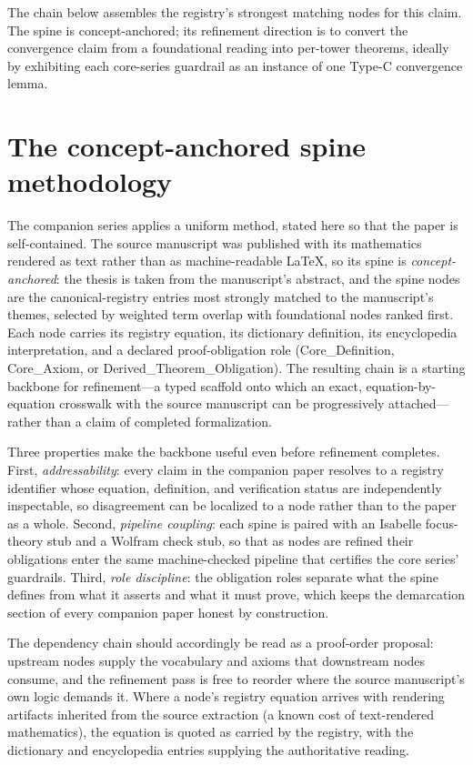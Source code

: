 \documentclass[11pt]{article}
\theoremstyle{remark}
\begin{document}
The chain below assembles the registry's strongest matching nodes for this claim. The spine is concept-anchored; its refinement direction is to convert the convergence claim from a foundational reading into per-tower theorems, ideally by exhibiting each core-series guardrail as an instance of one Type-C convergence lemma.

\section{The concept-anchored spine methodology}
\label{sec:method}

The companion series applies a uniform method, stated here so that the paper is self-contained. The source manuscript was published with its mathematics rendered as text rather than as machine-readable LaTeX, so its spine is \emph{concept-anchored}: the thesis is taken from the manuscript's abstract, and the spine nodes are the canonical-registry entries most strongly matched to the manuscript's themes, selected by weighted term overlap with foundational nodes ranked first. Each node carries its registry equation, its dictionary definition, its encyclopedia interpretation, and a declared proof-obligation role (Core\_Definition, Core\_Axiom, or Derived\_Theorem\_Obligation). The resulting chain is a starting backbone for refinement---a typed scaffold onto which an exact, equation-by-equation crosswalk with the source manuscript can be progressively attached---rather than a claim of completed formalization.

Three properties make the backbone useful even before refinement completes. First, \emph{addressability}: every claim in the companion paper resolves to a registry identifier whose equation, definition, and verification status are independently inspectable, so disagreement can be localized to a node rather than to the paper as a whole. Second, \emph{pipeline coupling}: each spine is paired with an Isabelle focus-theory stub and a Wolfram check stub, so that as nodes are refined their obligations enter the same machine-checked pipeline that certifies the core series' guardrails. Third, \emph{role discipline}: the obligation roles separate what the spine defines from what it asserts and what it must prove, which keeps the demarcation section of every companion paper honest by construction.

The dependency chain should accordingly be read as a proof-order proposal: upstream nodes supply the vocabulary and axioms that downstream nodes consume, and the refinement pass is free to reorder where the source manuscript's own logic demands it. Where a node's registry equation arrives with rendering artifacts inherited from the source extraction (a known cost of text-rendered mathematics), the equation is quoted as carried by the registry, with the dictionary and encyclopedia entries supplying the authoritative reading.
\end{document}
